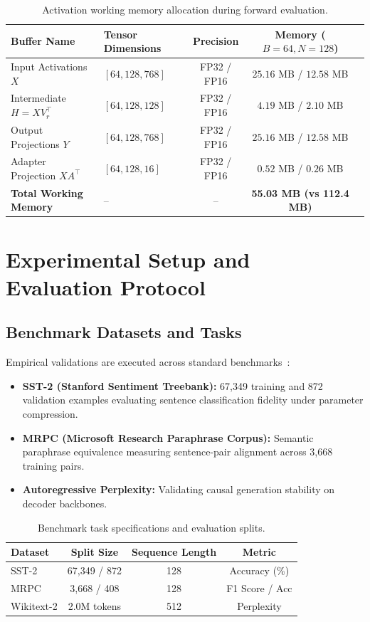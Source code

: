 \begin{table}[H]
\centering
\small
\begin{tabular}{llccc}
\toprule
\textbf{Buffer Name} & \textbf{Tensor Dimensions} & \textbf{Precision} & \textbf{Memory ($B=64, N=128$)} \\
\midrule
Input Activations $X$ & $[64, 128, 768]$ & FP32 / FP16 & $25.16$ MB / $12.58$ MB \\
Intermediate $H = X V_r^\top$ & $[64, 128, 128]$ & FP32 / FP16 & $4.19$ MB / $2.10$ MB \\
Output Projections $Y$ & $[64, 128, 768]$ & FP32 / FP16 & $25.16$ MB / $12.58$ MB \\
Adapter Projection $X A^\top$ & $[64, 128, 16]$ & FP32 / FP16 & $0.52$ MB / $0.26$ MB \\
\midrule
\textbf{Total Working Memory} & -- & -- & \textbf{55.03 MB (vs 112.4 MB)} \\
\bottomrule
\end{tabular}
\caption{Activation working memory allocation during forward evaluation.}
\end{table}


\section{Experimental Setup and Evaluation Protocol}

\subsection{Benchmark Datasets and Tasks}
Empirical validations are executed across standard benchmarks~\citep{sanh2019distilbert,liu2019roberta,radford2019gpt2,touvron2023llama}:
\begin{itemize}
\item \textbf{SST-2 (Stanford Sentiment Treebank):} 67,349 training and 872 validation examples evaluating sentence classification fidelity under parameter compression.
\item \textbf{MRPC (Microsoft Research Paraphrase Corpus):} Semantic paraphrase equivalence measuring sentence-pair alignment across 3,668 training pairs.
\item \textbf{Autoregressive Perplexity:} Validating causal generation stability on decoder backbones.
\end{itemize}

\begin{table}[H]
\centering
\small
\begin{tabular}{lccc}
\toprule
\textbf{Dataset} & \textbf{Split Size} & \textbf{Sequence Length} & \textbf{Metric} \\
\midrule
SST-2 & 67,349 / 872 & 128 & Accuracy (\%) \\
MRPC & 3,668 / 408 & 128 & F1 Score / Acc \\
Wikitext-2 & 2.0M tokens & 512 & Perplexity \\
\bottomrule
\end{tabular}
\caption{Benchmark task specifications and evaluation splits.}
\label{tab:task_specs}
\end{table}

